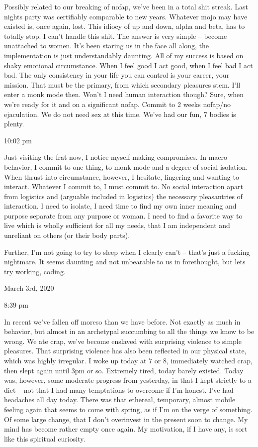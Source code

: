 Possibly related to our breaking of nofap, we've been in a total shit
streak. Last nights party was certifiably comparable to new years.
Whatever mojo may have existed is, once again, lost. This idiocy of up
and down, alpha and beta, has to totally stop. I can't handle this shit.
The answer is very simple -- become unattached to women. It's been
staring us in the face all along, the implementation is just
understandably daunting. All of my success is based on shaky emotional
circumstance. When I feel good I act good, when I feel bad I act bad.
The only consistency in your life you can control is your career, your
mission. That must be the primary, from which secondary pleasures stem.
I'll enter a monk mode then. Won't I need human interaction though?
Sure, when we're ready for it and on a significant nofap. Commit to 2
weeks nofap/no ejaculation. We do not need sex at this time. We've had
our fun, 7 bodies is plenty.

10:02 pm

Just visiting the frat now, I notice myself making compromises. In macro
behavior, I commit to one thing, to monk mode and a degree of social
isolation. When thrust into circumstance, however, I hesitate, lingering
and wanting to interact. Whatever I commit to, I must commit to. No
social interaction apart from logistics and (arguable included in
logistics) the necessary pleasantries of interaction. I need to isolate,
I need time to find my own inner meaning and purpose separate from any
purpose or woman. I need to find a favorite way to live which is wholly
sufficient for all my needs, that I am independent and unreliant on
others (or their body parts).

\qquad Further, I'm not going to try to sleep when I clearly can't --
that's just a fucking nightmare. It seems daunting and not unbearable to
us in forethought, but lets try working, coding.

\bigskip
\bigskip
March 3rd, 2020

8:39 pm

In recent we've fallen off moreso than we have before. Not exactly as
much in behavior, but almost in an archetypal succumbing to all the
things we know to be wrong. We ate crap, we've become enslaved with
surprising violence to simple pleasures. That surprising violence has
also been reflected in our physical state, which was highly irregular. I
woke up today at 7 or 8, immediately watched crap, then slept again
until 3pm or so. Extremely tired, today barely existed. Today was,
however, some moderate progress from yesterday, in that I kept strictly
to a diet -- not that I had many temptations to overcome if I'm honest.
I've had headaches all day today. There was that ethereal, temporary,
almost mobile feeling again that seems to come with spring, as if I'm on
the verge of something. Of some large change, that I don't overinvest in
the present soon to change. My mind has become rather empty once again.
My motivation, if I have any, is sort like this spiritual curiosity.

